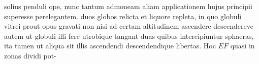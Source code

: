 solius penduli\protect{} ope,
nunc tantum admoneam aliam applicationem hujus principii superesse perelegantem.
duos globos\protect{} relicta et liquore\protect{} repleta,
in quo globuli vitrei\protect{}
prout opus gravati non nisi ad certam altitudinem ascendere descendereve
autem ut globuli illi\protect{} fere
utrobique tangant duas quibus intercipiuntur sphaeras,
ita tamen ut aliqua sit illis ascendendi descendendique libertas.
Hoc 
$\displaystyle EF$ quasi in zonas\protect{} dividi pot-
\pend
\newpage
\pstart
\noindent 
